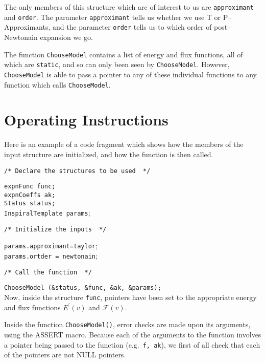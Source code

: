 \documentclass[12pt]{article}
\begin{document}
The only members of this structure which are of interest to us are \texttt{approximant} and \texttt{order}. The parameter \texttt{approximant} tells us whether we use T or P--Approximants, and the parameter \texttt{order} tells us to which order of post--Newtonain expansion we go.

The function \texttt{ChooseModel} contains a list of energy and flux functions, all of which are \texttt{static}, and so can only been seen by \texttt{ChooseModel}. However, \texttt{ChooseModel} is able to pass a pointer to any of these individual functions to any function which calls \texttt{ChooseModel}.


\section{Operating Instructions}

Here is an example of a code fragment which shows how the members of the input structure are initialized, and how the function is then called.


\vspace{5mm}

\noindent
\begin{verbatim}
/* Declare the structures to be used  */
\end{verbatim}
\texttt{expnFunc func;} \\
\texttt{expnCoeffs ak;} \\
\texttt{Status status;} \\
\texttt{InspiralTemplate params};
\begin{verbatim}
/* Initialize the inputs  */
\end{verbatim}
\texttt{params.approximant=taylor}; \\
\texttt{params.ortder = newtonain};

\begin{verbatim}
/* Call the function  */
\end{verbatim}
\texttt{ChooseModel (\&status, \&func, \&ak, \&params);} \\


Now, inside the structure \texttt{func}, pointers have been set to the appropriate energy and flux functions $E^{\prime}(v)$ and $\mathcal{F}(v)$.


Inside the function \texttt{ChooseModel()}, error checks are made upon its arguments, using the ASSERT macro. Because each of the arguments to the function involves a pointer being passed to the function (e.g.\ \texttt{f, ak}), we first of all check that each of the pointers are not NULL pointers.
\end{document}
